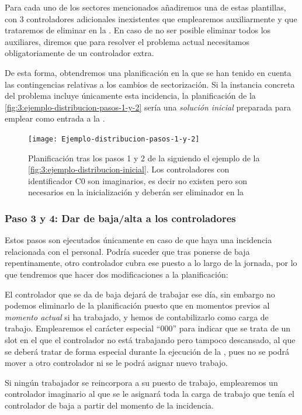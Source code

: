 Para cada uno de los sectores mencionados añadiremos una de estas plantillas, con 3 controladores adicionales inexistentes que emplearemos auxiliarmente y que trataremos de eliminar en la \fasedos{}. En caso de no ser posible eliminar todos los auxiliares, diremos que para resolver el problema actual necesitamos obligatoriamente de un controlador extra.

De esta forma, obtendremos una planificación en la que se han tenido en cuenta las contingencias relativas a los cambios de sectorización. Si la instancia concreta del problema incluye únicamente esta incidencia, la planificación de la \autoref{fig:3:ejemplo-distribucion-pasos-1-y-2} sería una \textit{solución inicial} preparada para emplear como entrada a la \fasedos{}.

\begin{figure}[htbp]
	\centering
	\texttt{[image: Ejemplo-distribucion-pasos-1-y-2]}
	\caption[Planificación tras los pasos 1 y 2 de la Fase 1]{Planificación tras los pasos 1 y 2 de la \faseuno{} siguiendo el ejemplo de la \autoref{fig:3:ejemplo-distribucion-inicial}. Los controladores con identificador C0 son imaginarios, es decir no existen pero son necesarios en la inicialización y deberán ser eliminador en la \fasedos{}} 
	\label{fig:3:ejemplo-distribucion-pasos-1-y-2}
\end{figure}

\subsubsection{Paso 3 y 4: Dar de baja/alta a los controladores}
Estos pasos son ejecutados únicamente en caso de que haya una incidencia relacionada con el personal. Podría suceder que tras ponerse de baja repentinamente, otro controlador cubra ese puesto a lo largo de la jornada, por lo que tendremos que hacer dos modificaciones a la planificación:

El controlador que se da de baja dejará de trabajar ese día, sin embargo no podemos eliminarlo de la planificación puesto que en momentos previos al \textit{momento actual} si ha trabajado, y hemos de contabilizarlo como carga de trabajo. Emplearemos el carácter especial ``000'' para indicar que se trata de un slot en el que el controlador no está trabajando pero tampoco descansado, al que se deberá tratar de forma especial durante la ejecución de la \fasedos{}, pues no se podrá mover a otro controlador ni se le podrá asignar nuevo trabajo. 

Si ningún trabajador se reincorpora a su puesto de trabajo, emplearemos un controlador imaginario al que se le asignará toda la carga de trabajo que tenía el controlador de baja a partir del momento de la incidencia.

